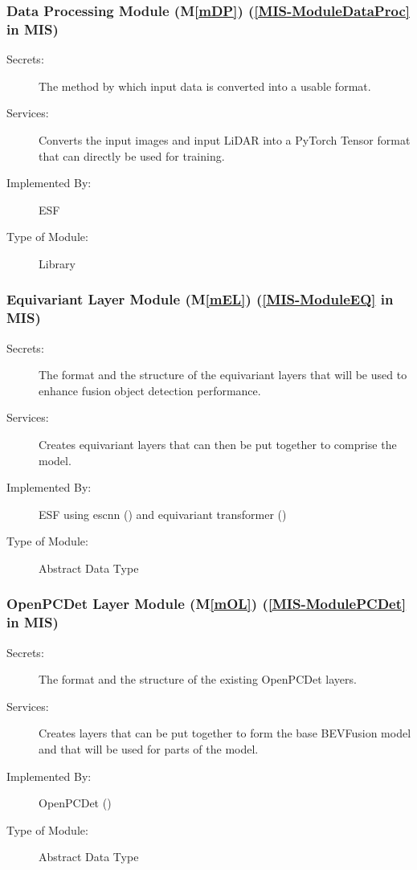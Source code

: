 \documentclass[12pt, titlepage]{article}
\newcommand{\ProjectName}{ESF }
\newcommand{\mref}[1]{M\ref{#1}}
\begin{document}
\subsubsection{Data Processing Module (\mref{mDP}) (\ref{MIS-ModuleDataProc} in MIS)}
\begin{description}
\item[Secrets:] The method by which input data is converted into a usable format.
\item[Services:] Converts the input images and input LiDAR into a PyTorch Tensor format that can directly be used for training.
\item[Implemented By:] \ProjectName{} 
\item[Type of Module:] Library
\end{description}

\subsubsection{Equivariant Layer Module (\mref{mEL}) (\ref{MIS-ModuleEQ} in MIS)}
\begin{description}
\item[Secrets:] The format and the structure of the equivariant layers that will be used to enhance fusion object detection performance.
\item[Services:] Creates equivariant layers that can then be put together to comprise the model. 
\item[Implemented By:] \ProjectName{} using escnn (\cite{cesa2022a}) and equivariant transformer (\cite{tai2019equivariant})
\item[Type of Module:] Abstract Data Type
\end{description}

\subsubsection{OpenPCDet Layer Module (\mref{mOL}) (\ref{MIS-ModulePCDet} in MIS)}
\begin{description}
\item[Secrets:] The format and the structure of the existing OpenPCDet layers.
\item[Services:] Creates layers that can be put together to form the base BEVFusion model and that will be used for parts of the model.
\item[Implemented By:] OpenPCDet (\cite{openpcdet2020})
\item[Type of Module:] Abstract Data Type
\end{description}
\end{document}
